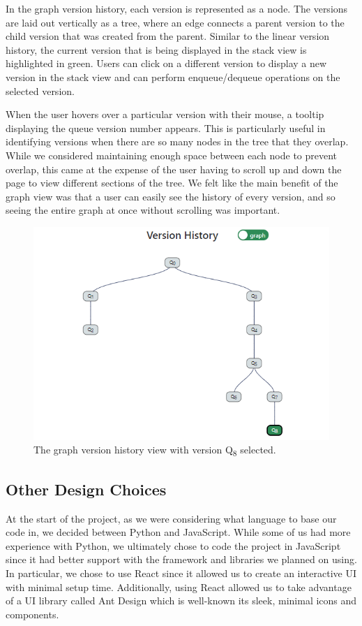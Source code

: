 \documentclass[runningheads]{llncs}
\begin{document}
In the graph version history, each version is represented as a node. The versions are laid out vertically as a tree, where an edge connects a parent version to the child version that was created from the parent. Similar to the linear version history, the current version that is being displayed in the stack view is highlighted in green. Users can click on a different version to display a new version in the stack view and can perform enqueue/dequeue operations on the selected version. 

When the user hovers over a particular version with their mouse, a tooltip displaying the queue version number appears. This is particularly useful in identifying versions when there are so many nodes in the tree that they overlap. While we considered maintaining enough space between each node to prevent overlap, this came at the expense of the user having to scroll up and down the page to view different sections of the tree. We felt like the main benefit of the graph view was that a user can easily see the history of every version, and so seeing the entire graph at once without scrolling was important.

\begin{figure}[h!]
    \centering
    \includegraphics[width=.9\textwidth]{graph-version-history.PNG}
    \caption{The graph version history view with version Q\textsubscript{8} selected.}
\end{figure}

\subsection{Other Design Choices}

At the start of the project, as we were considering what language to base our code in, we decided between Python and JavaScript. While some of us had more experience with Python, we ultimately chose to code the project in JavaScript since it had better support with the framework and libraries we planned on using. In particular, we chose to use React since it allowed us to create an interactive UI with minimal setup time. Additionally, using React allowed us to take advantage of a UI library called Ant Design which is well-known its sleek, minimal icons and components. 
\end{document}
